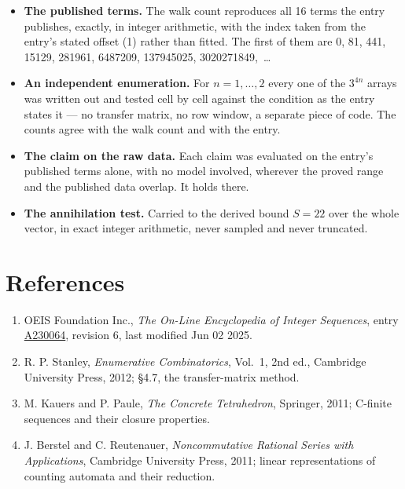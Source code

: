 \documentclass[11pt]{article}
\theoremstyle{definition}
\begin{document}
\begin{itemize}

\item {\bfseries The published terms.} The walk count reproduces all 16 terms the entry publishes, exactly, in integer arithmetic, with the index taken from the entry's stated offset (1) rather than fitted. The first of them are 0, 81, 441, 15129, 281961, 6487209, 137945025, 3020271849,~\dots

\item {\bfseries An independent enumeration.} For $n = 1,\dots,2$ every one of the $3^{4n}$ arrays was written out and tested cell by cell against the condition as the entry states it --- no transfer matrix, no row window, a separate piece of code. The counts agree with the walk count and with the entry.

\item {\bfseries The claim on the raw data.} Each claim was evaluated on the entry's published terms alone, with no model involved, wherever the proved range and the published data overlap. It holds there.

\item {\bfseries The annihilation test.} Carried to the derived bound $S = 22$ over the whole vector, in exact integer arithmetic, never sampled and never truncated.

\end{itemize}

\section{References}

\begin{enumerate}

\item OEIS Foundation Inc., \emph{The On-Line Encyclopedia of Integer Sequences}, entry \href{https://oeis.org/A230064}{A230064}, revision 6, last modified Jun 02 2025.

\item R. P. Stanley, \emph{Enumerative Combinatorics}, Vol.~1, 2nd ed., Cambridge University Press, 2012; \S4.7, the transfer-matrix method.

\item M. Kauers and P. Paule, \emph{The Concrete Tetrahedron}, Springer, 2011; C-finite sequences and their closure properties.

\item J. Berstel and C. Reutenauer, \emph{Noncommutative Rational Series with Applications}, Cambridge University Press, 2011; linear representations of counting automata and their reduction.

\end{enumerate}
\end{document}
